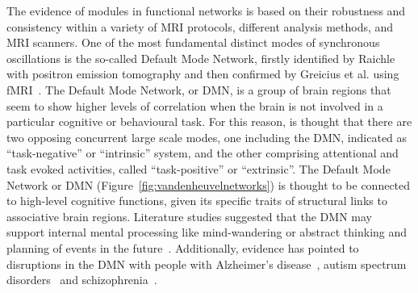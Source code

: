 The evidence of modules in functional networks is based on their robustness and consistency within a variety of MRI protocols, different analysis methods, and MRI scanners.
One of the most fundamental distinct modes of synchronous oscillations is the so-called Default Mode Network, firstly identified by Raichle~\cite{raichle2001} with positron emission tomography and then confirmed by Greicius et al. using fMRI~\cite{greicius2003}.
The Default Mode Network, or DMN, is a group of brain regions that seem to show higher levels of correlation when the brain is not involved in a particular cognitive or behavioural task. For this reason, is thought that there are two opposing concurrent large scale modes, one including the DMN, indicated as ``task-negative'' or ``intrinsic'' system, and the other comprising attentional and task evoked activities, called ``task-positive'' or ``extrinsic''.
The Default Mode Network or DMN (Figure~\ref{fig:vandenheuvelnetworks}) is thought to be connected to high-level cognitive functions, given its specific traits of structural links to associative brain regions.
Literature studies suggested that the DMN may support internal mental processing like mind-wandering or abstract thinking and planning of events in the future~\cite{gusnard2001,buckner2008}.
Additionally, evidence has pointed to disruptions in the DMN with people with Alzheimer's disease~\cite{buckner2008}, autism spectrum disorders~\cite{washington2014} and schizophrenia~\cite{garrity2007}.




